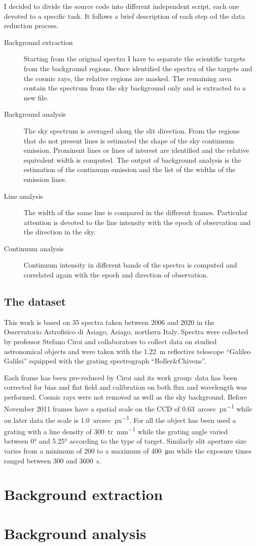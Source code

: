 I decided to divide the source code into different independent script, each one devoted to a specific task. It follows a brief description of each step od the data reduction process.
\begin{description}
	\item [Background extraction] Starting from the original spectra I have to separate the scientific targets from the background regions. Once identified the spectra of the targets and the cosmic rays, the relative regions are masked. The remaining area contain the spectrum from the sky background only and is extracted to a new file.
	\item [Background analysis] The sky spectrum is averaged along the slit direction. From the regions that do not present lines is estimated the shape of the sky continuum emission. Prominent lines or lines of interest are identified and the relative equivalent width is computed. The output of background analysis is the estimation of the continuum emission and the list of the widths of the emission lines.
	\item [Line analysis] The width of the same line is compared in the different frames. Particular attention is devoted to the line intensity with the epoch of observation and the direction in the sky.
	\item [Continuum analysis] Continuum intensity in different bands of the spectra is computed and correlated again with the epoch and direction of observation.
\end{description}

\subsection{The dataset}
This work is based on 35 spectra taken between 2006 and 2020 in the Osservatorio Astrofisico di Asiago, Asiago, northern Italy. Spectra were collected by professor Stefano Ciroi and collaborators to collect data on studied astronomical objects and were taken with the \SI{1.22}{m} reflective telescope ``Galileo Galilei'' equipped with the grating spectrograph ``Boller\&Chivens''.

Each frame has been pre-reduced by Ciroi and its work group: data has been corrected for bias and flat field and calibration on both flux and wavelength was performed. Cosmic rays were not removed as well as the sky background. Before November 2011 frames have a spatial scale on the CCD of \SI{0.63}{arcsec\per{px}} while on later data the scale is \SI{1.0}{arcsec\per{px}}. For all the object has been used a grating with a line density of \SI{300}{tr\per{mm}} while the grating angle varied between \ang{0} and \ang{5.25} according to the type of target. Similarly slit aperture size varies from a minimum of 200 to a maximum of \SI{400}{\micro\metre} while the exposure times ranged between 300 and \SI{3600}{s}.

\section{Background extraction}

\section{Background analysis}

